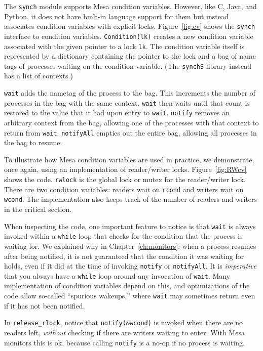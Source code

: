 \documentclass{report}
\begin{document}
The \texttt{synch} module supports Mesa condition variables.  However, like C, Java, and Python,
it does not have built-in language support for them but instead associates condition variables
with explicit locks.
Figure~\ref{fig:cv} shows the \texttt{synch} interface to condition variables.
\texttt{Condition(lk)} creates a new condition variable associated with the given pointer
to a lock \texttt{lk}.
The condition variable itself is represented by a dictionary containing the pointer to the lock
and a bag of name tags of processes waiting on the condition variable.
(The \texttt{synchS} library instead has a list of contexts.)

\texttt{wait} adds the nametag of the process to the bag.  This increments the number of processes
in the bag with the same context.  \texttt{wait} then waits until that count is restored to the
value that it had upon entry to \texttt{wait}.  \texttt{notify} removes an arbitrary context from
the bag, allowing one of the processes with that context to return from \texttt{wait}.
\texttt{notifyAll} empties out the entire bag, allowing all processes in the bag to resume.

To illustrate how Mesa condition variables are used in practice, we demonstrate, once again,
using an implementation of reader/writer locks.
Figure~\ref{fig:RWcv} shows the code.  \texttt{rwlock} is the global lock or mutex for the
reader/writer lock.  There are two condition variables: readers wait on \texttt{rcond} and
writers wait on \texttt{wcond}.  The implementation also keeps track of the number of
readers and writers in the critical section.

When inspecting the code, one important feature to notice is that \texttt{wait} is always
invoked within a \texttt{while} loop that checks for the condition that the process is
waiting for.  We explained why in Chapter~\ref{ch:monitors}: when a process resumes after
being notified, it is not guaranteed that the condition it was waiting for holds, even
if it did at the time of invoking \texttt{notify} or \texttt{notifyAll}.
It is \emph{imperative} that you always have a \texttt{while} loop around any invocation
of \texttt{wait}.
Many implementation of condition variables depend on this, and optimizations of the
code allow so-called ``spurious wakeups,'' where \texttt{wait} may sometimes return even
if it has not been notified.

In \texttt{release\_rlock}, notice that \texttt{notify(\&wcond)} is invoked when there
are no readers left, \emph{without} checking if there are writers waiting to enter.
With Mesa monitors this is ok, because calling \texttt{notify} is a no-op if no process
is waiting.
\end{document}
